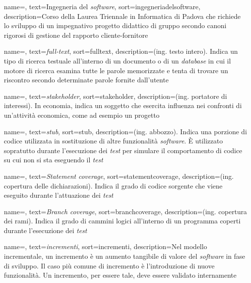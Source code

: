  {
	name=,
	text=Ingegneria del \textit{software},
	sort=ingegneriadelsoftware,
	description={Corso della Laurea Triennale in Informatica di Padova che richiede lo sviluppo di un impegnativo progetto didattico di gruppo secondo canoni rigorosi di gestione del rapporto cliente-fornitore}
}

 {
	name=,
	text=\textit{full-text},
	sort=fulltext,
	description={(ing. testo intero). Indica un tipo di ricerca testuale all'interno di un documento o di un \textit{database} in cui il motore di ricerca esamina tutte le parole memorizzate e tenta di trovare un riscontro secondo determinate parole fornite dall'utente}
}

 {
	name=,
	text=\textit{stakeholder},
	sort=stakeholder,
	description={(ing. portatore di interessi). In economia, indica un soggetto che esercita influenza nei confronti di un'attività economica, come ad esempio un progetto}
}

 {
	name=,
	text=\textit{stub},
	sort=stub,
	description={(ing. abbozzo). Indica una porzione di codice utilizzata in sostituzione di altre funzionalità \textit{software}. È utilizzato sopratutto durante l'esecuzione dei \textit{test} per simulare il comportamento di codice su cui non si sta eseguendo il \textit{test}}
}

 {
	name=,
	text=\textit{Statement coverage},
	sort=statementcoverage,
	description={(ing. copertura delle dichiarazioni). Indica il grado di codice sorgente che viene eseguito durante l'attuazione dei \textit{test}}
}

 {
	name=,
	text=\textit{Branch coverage},
	sort=branchcoverage,
	description={(ing. copertura dei rami). Indica il grado di cammini logici all'interno di un programma coperti durante l'esecuzione dei \textit{test}}
}

 {
	name=,
	text=\textit{incrementi},
	sort=incrementi,
	description={Nel modello incrementale, un incremento è un aumento tangibile di valore del \textit{software} in fase di sviluppo. Il caso più comune di incremento è l'introduzione di nuove funzionalità. Un incremento, per essere tale, deve essere validato internamente}
}


